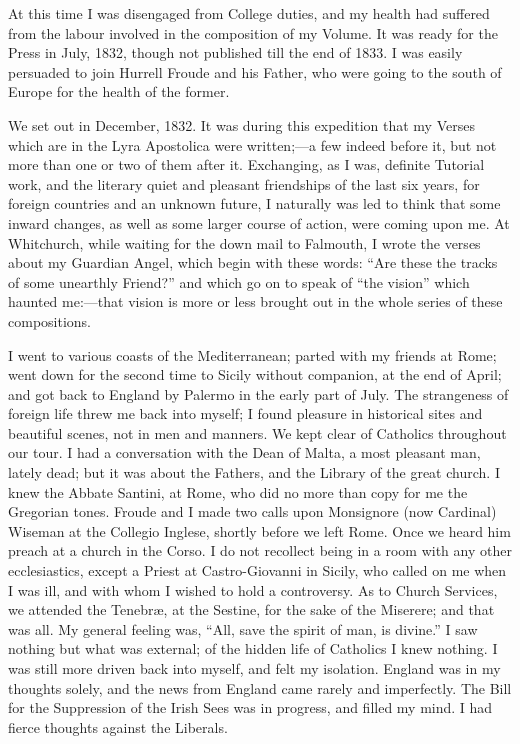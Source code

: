 At this time I was disengaged from College duties, and my
health had suffered from the labour involved in the composition of my
Volume. It was ready for the Press in July, 1832, though not published
till the end of 1833. I was easily persuaded to join Hurrell Froude
and his Father, who were going to the south of Europe for the health
of the former.

We set out in December, 1832. It was during this expedition that my
Verses which are in the Lyra Apostolica were written;—a few indeed
before it, but not more than one or two of them after it. Exchanging,
as I was, definite Tutorial work, and the literary quiet and pleasant friendships of the last
six years, for foreign countries and an unknown future, I naturally
was led to think that some inward changes, as well as some larger
course of action, were
coming upon me. At Whitchurch, while waiting for the down mail to
Falmouth, I wrote the verses about my Guardian Angel, which begin with
these words: ``Are these the tracks of some unearthly
Friend?'' and which go on to speak of ``the
vision'' which haunted me:—that vision is more or less brought
out in the whole series of these compositions.

I went to various coasts of the Mediterranean; parted with my
friends at Rome; went down for the second time to Sicily without
companion, at the end of April; and got back to England by Palermo
in the early part of July. The strangeness of foreign life threw me
back into myself; I found pleasure in historical sites and beautiful
scenes, not in men and manners. We kept clear of Catholics throughout
our tour. I had a conversation with the Dean of Malta, a most pleasant
man, lately dead; but it was about the Fathers, and the Library of the
great church. I knew the Abbate Santini, at Rome, who did no more than
copy for me the Gregorian tones. Froude and I made two calls upon
Monsignore (now Cardinal) Wiseman at the Collegio Inglese, shortly
before we left Rome. Once we heard him preach at a church in the Corso. I do not recollect being in a room with any other
ecclesiastics, except a Priest at Castro-Giovanni in Sicily, who
called on me when I was ill, and with whom I wished to hold a
controversy. As to Church Services, we attended the Tenebræ, at the
Sestine, for the sake of the Miserere; and that was all. My general
feeling was, ``All, save the spirit of man, is divine.'' I saw
nothing but what was external; of the hidden life of Catholics I knew
nothing. I was still more driven back into myself, and felt my
isolation. England was in my thoughts solely, and the news from
England came rarely and imperfectly. The Bill for the Suppression of
the Irish Sees was in progress, and filled my mind. I had fierce
thoughts against the Liberals.

